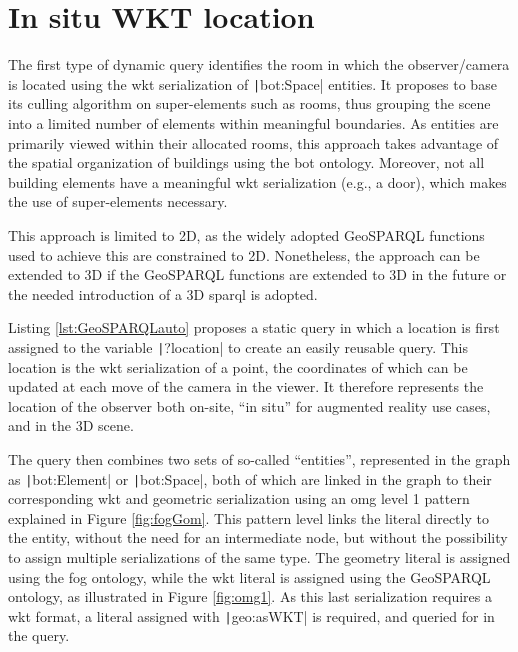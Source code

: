 \section{In situ WKT location} \label{sec:inSituWKT}
The first type of dynamic query identifies the room in which the observer/camera is located using the \ac{wkt} serialization of \texttt|bot:Space| entities. It proposes to base its culling algorithm on super-elements such as rooms, thus grouping the scene into a limited number of elements within meaningful boundaries. As entities are primarily viewed within their allocated rooms, this approach takes advantage of the spatial organization of buildings using the \ac{bot} ontology. Moreover, not all building elements have a meaningful \ac{wkt} serialization (e.g., a door), which makes the use of super-elements necessary.

This approach is limited to 2D, as the widely adopted GeoSPARQL functions used to achieve this are constrained to 2D. Nonetheless, the approach can be extended to 3D if the GeoSPARQL functions are extended to 3D in the future or the needed introduction of a 3D \ac{sparql} is adopted.

Listing \ref{lst:GeoSPARQLauto} proposes a static query in which a location is first assigned to the variable \texttt|?location| to create an easily reusable query. This location is the \ac{wkt} serialization of a point, the coordinates of which can be updated at each move of the camera in the viewer. It therefore represents the location of the observer both on-site, \enquote{in situ} for augmented reality use cases, and in the 3D scene.

The query then combines two sets of so-called \enquote{entities}, represented in the graph as \texttt|bot:Element| or \texttt|bot:Space|, both of which are linked in the graph to their corresponding \ac{wkt} and geometric serialization using an \ac{omg} level 1 pattern explained in Figure \ref{fig:fogGom}. This pattern level links the literal directly to the entity, without the need for an intermediate node, but without the possibility to assign multiple serializations of the same type. The geometry literal is assigned using the \ac{fog} ontology, while the \ac{wkt} literal is assigned using the GeoSPARQL ontology, as illustrated in Figure \ref{fig:omg1}. As this last serialization requires a \ac{wkt} format, a literal assigned with \texttt|geo:asWKT| is required, and queried for in the query.

